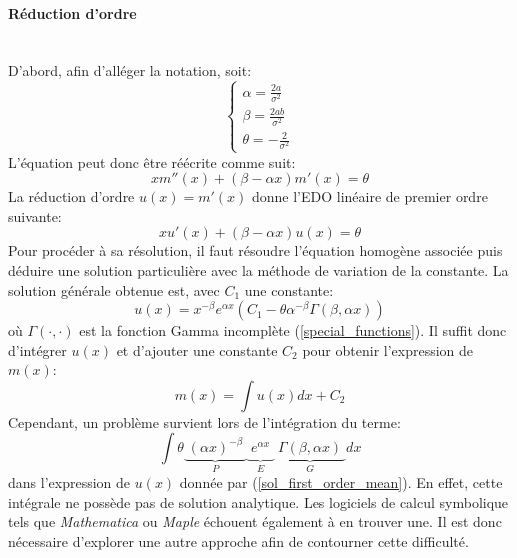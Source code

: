 \paragraph{Réduction d'ordre}\phantom{}\\
D'abord, afin d'alléger la notation, soit:
\begin{equation}\label{notation}
\begin{cases}
    \alpha = \frac{2a}{\sigma^2} \\
    \beta=\frac{2ab}{\sigma^2} \\
    \theta=-\frac{2}{\sigma^2}
\end{cases}
\end{equation}
L'équation peut donc être réécrite comme suit: 
\begin{equation}\label{simplified_ode_mean}
    xm''(x)+(\beta-\alpha x)m'(x)=\theta
\end{equation}
La réduction d'ordre $u(x)=m'(x)$ donne l'\acs{EDO} linéaire de premier ordre suivante:
\begin{equation}\label{order_reduction}
xu'(x)+(\beta-\alpha x)u(x)=\theta
\end{equation}
Pour procéder à sa résolution, il faut résoudre l'équation homogène associée puis déduire une solution particulière avec la méthode de variation de la constante. La solution générale obtenue est, avec $C_1$ une constante: 
\begin{equation}\label{sol_first_order_mean}
    u(x)=x^{-\beta}e^{\alpha x}(C_1-\theta \alpha^{-\beta}\Gamma(\beta, \alpha x))
\end{equation}
où $\Gamma(\cdot,\cdot)$ est la fonction Gamma incomplète (\ref{special_functions}).
Il suffit donc d'intégrer $u(x)$ et d'ajouter une constante $C_2$ pour obtenir l'expression de $m(x)$: 
\begin{equation}\label{intergration_sol_first_order}
    m(x)=\int u(x)dx+C_2
\end{equation}
Cependant, un problème survient lors de l'intégration du terme:
\begin{equation}\label{problematic_integral}
    \int\theta \underbrace{\phantom{|}{(\alpha x)}^{-\beta}\phantom{|}}_{P}\underbrace{\phantom{|}e^{\alpha x}\phantom{|}}_{E}\underbrace{\phantom{|}\Gamma(\beta, \alpha x)\phantom{|}}_{G}dx
\end{equation}
dans l'expression de $u(x)$ donnée par (\ref{sol_first_order_mean}). En effet, cette intégrale ne possède pas de solution analytique. Les logiciels de calcul symbolique tels que \textit{Mathematica} ou \textit{Maple} échouent également à en trouver une. Il est donc nécessaire d'explorer une autre approche afin de contourner cette difficulté.
